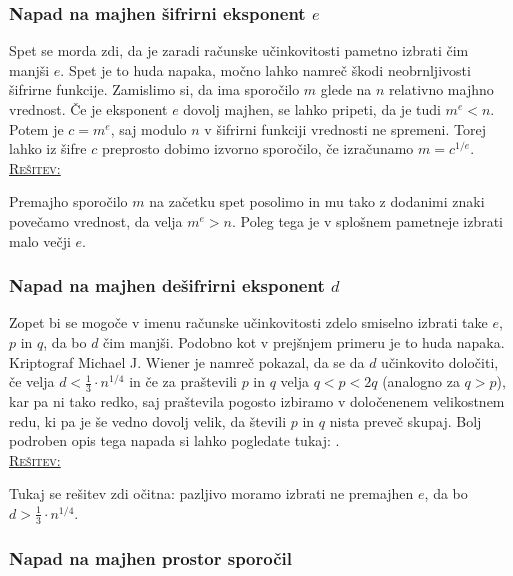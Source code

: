 \documentclass[a4paper, 12pt]{article} %
\newenvironment{matematika}[1]{
\textcolor{bostonuniversityred}{\underline{\textsc{#1:}}}
}{
}
\begin{document}
\subsubsection{Napad na majhen šifrirni eksponent $e$}

Spet se morda zdi, da je zaradi računske učinkovitosti pametno izbrati čim manjši $e$. Spet je to huda napaka, močno lahko namreč škodi neobrnljivosti šifrirne funkcije.
\newline
\newline
Zamislimo si, da ima sporočilo $m$ glede na $n$ relativno majhno vrednost. Če je eksponent $e$ dovolj majhen, se lahko pripeti, da je tudi $m^e < n$. Potem je $c = m^e$, saj modulo $n$ v šifrirni funkciji vrednosti ne spremeni. Torej lahko iz šifre $c$ preprosto dobimo izvorno sporočilo, če izračunamo $m = c^{1/e}$. \\

\begin{matematika}{Rešitev}
Premajho sporočilo $m$ na začetku spet posolimo in mu tako z dodanimi znaki povečamo vrednost, da velja $m^e > n$. Poleg tega je v splošnem pametneje izbrati malo večji $e$.
\end{matematika}

\subsubsection{Napad na majhen dešifrirni eksponent $d$}

Zopet bi se mogoče v imenu računske učinkovitosti zdelo smiselno izbrati take $e$, $p$ in $q$, da bo $d$ čim manjši. Podobno kot v prejšnjem primeru je to huda napaka. Kriptograf Michael J. Wiener je namreč pokazal, da se da $d$ učinkovito določiti, če velja $d < \frac{1}{3} \cdot n^{1/4}$ in če za praštevili $p$ in $q$ velja $q < p < 2q$ (analogno za $q > p$), kar pa ni tako redko, saj praštevila pogosto izbiramo v določenenem velikostnem redu, ki pa je še vedno dovolj velik, da števili $p$ in $q$ nista preveč skupaj.
\newline
\newline
Bolj podroben opis tega napada si lahko pogledate tukaj: \cite{wiener}. \\

\begin{matematika}{Rešitev}
Tukaj se rešitev zdi očitna: pazljivo moramo izbrati ne premajhen $e$, da bo $d > \frac{1}{3} \cdot n^{1/4}$.
\end{matematika}

\subsubsection{Napad na majhen prostor sporočil}
\end{document}
